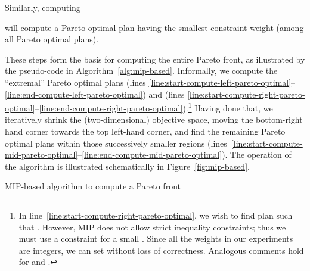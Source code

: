 \documentclass[jcs,crcready]{iosart1c}
\begin{document}
 \noindent Similarly, computing 
 
 will compute a Pareto optimal plan  having the smallest constraint weight (among all Pareto optimal plans).


 These steps form the basis for computing the entire Pareto front, as illustrated by the pseudo-code in Algorithm~\ref{alg:mip-based}.
 Informally, we compute the ``extremal'' Pareto optimal plans  (lines \ref{line:start-compute-left-pareto-optimal}--\ref{line:end-compute-left-pareto-optimal}) and  (lines \ref{line:start-compute-right-pareto-optimal}--\ref{line:end-compute-right-pareto-optimal}).\footnote{In line~\ref{line:start-compute-right-pareto-optimal}, we wish to find plan  such that .  
	     However, MIP does not allow strict inequality constraints; thus we must use a constraint  for a small .  
	     Since all the weights in our experiments are integers, we can set  without loss of correctness.
	     Analogous comments hold for  and .} 
 Having done that, we iteratively shrink the (two-dimensional) objective space, moving the bottom-right hand corner towards the top left-hand corner, and find the remaining Pareto optimal plans within those successively smaller regions (lines~\ref{line:start-compute-mid-pareto-optimal}--\ref{line:end-compute-mid-pareto-optimal}).
The operation of the algorithm is illustrated schematically in Figure~\ref{fig:mip-based}.


\begin{algorithm2e}[!h]
\caption{MIP-based algorithm to compute a Pareto front}
\label{alg:mip-based}

\;\label{line:start-compute-left-pareto-optimal}
\;\label{line:end-compute-left-pareto-optimal}
\If {}
{
	\Return \;
}

\;

\;\label{line:start-compute-right-pareto-optimal}
\;\label{line:end-compute-right-pareto-optimal}
\If {}
{
	\Return \;
}

\;

 { \label{line:begin-loop}
	\;\label{line:start-compute-mid-pareto-optimal}
	\;\label{line:end-compute-mid-pareto-optimal}
	\If {}
	{
		\Return \;
	}
	
	\;
	\;\label{line:end-loop}
}

\Return \;
\end{algorithm2e}
\end{document}

